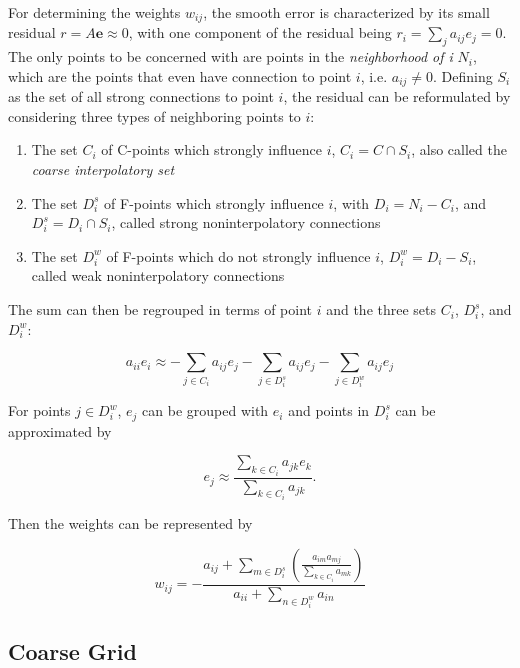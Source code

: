 For determining the weights $w_{ij}$, the smooth error is characterized by its small residual $r = A\mathbf{e} \approx 0$, with one component of the residual being $r_i = \sum_{j}{a_{ij}e_j} = 0$. The only points to be concerned with are points in the \emph{neighborhood of i} $N_i$, which are the points that even have connection to point $i$, i.e. $a_{ij} \neq 0$. Defining $S_i$ as the set of all strong connections to point $i$, the residual can be reformulated by considering three types of neighboring points to $i$:
\begin{enumerate}
	\item The set $C_i$ of C-points which strongly influence $i$, $C_i = C \cap S_i$, also called the \emph{coarse interpolatory set}
	\item The set $D_i^s$ of F-points which strongly influence $i$, with $D_i = N_i - C_i$, and $D_i^s = D_i \cap S_i$, called strong noninterpolatory connections
	\item The set $D_i^w$ of F-points which do not strongly influence $i$, $D_i^w = D_i - S_i$, called weak noninterpolatory connections
\end{enumerate}

The sum can then be regrouped in terms of point $i$ and the three sets $C_i$, $D_i^s$, and $D_i^w$:

\begin{equation}
	a_{ii}e_i \approx -\sum_{j \in C_i}{a_{ij}e_j} - \sum_{j \in D_i^s}{a_{ij}e_j} - \sum_{j \in D_i^w}{a_{ij}e_j}
\end{equation}

For points $j \in D_i^w$, $e_j$ can be grouped with $e_i$ and points in $D_i^s$ can be approximated by

\begin{equation}
	e_j \approx \frac{\displaystyle \sum_{k \in C_i}{a_{jk}e_k}}{\displaystyle \sum_{k \in C_i}{a_{jk}}}.
	\label{ej_approx}
\end{equation}

Then the weights can be represented by

\begin{equation}
	w_{ij} = - \frac{a_{ij} + \displaystyle \sum_{m \in D_i^s}{\left(\frac{a_{im}a_{mj}}{\displaystyle \sum_{k \in C_i}{a_{mk}}}\right)}}{a_{ii} + \displaystyle \sum_{n \in D_i^w}{a_{in}}}
\end{equation}

\subsection{Coarse Grid} %

